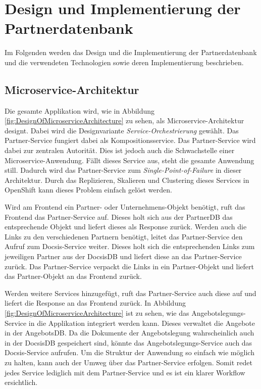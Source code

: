 \chapter{Design und Implementierung der Partnerdatenbank}
Im Folgenden werden das Design und die Implementierung der Partnerdatenbank und die verwendeten Technologien sowie deren Implementierung beschrieben.

\section{Microservice-Architektur}
Die gesamte Applikation wird, wie in Abbildung \ref{fig:DesignOfMicroserviceArchitecture} zu sehen, als Microservice-Architektur designt. Dabei wird die Designvariante \textit{Service-Orchestrierung} gewählt. Das Partner-Service fungiert dabei als Kompositionsservice. Das Partner-Service wird dabei zur zentralen Autorität. Dies ist jedoch auch die Schwachstelle einer Microservice-Anwendung. Fällt dieses Service aus, steht die gesamte Anwendung still. Dadurch wird das Partner-Service zum \textit{Single-Point-of-Failure} in dieser Architektur. Durch das Replizieren, Skalieren und Clustering dieses Services in OpenShift kann dieses Problem einfach gelöst werden.

Wird am Frontend ein Partner- oder Unternehmens-Objekt benötigt, ruft das Frontend das Partner-Service auf. Dieses holt sich aus der PartnerDB das entsprechende Objekt und liefert dieses als Response zurück.
Werden auch die Links zu den verschiedenen Partnern benötigt, leitet das Partner-Service den Aufruf zum Docsis-Service weiter. Dieses holt sich die entsprechenden Links zum jeweiligen Partner aus der DocsisDB und liefert diese an das Partner-Service zurück. Das Partner-Service verpackt die Links in ein Partner-Objekt und liefert das Partner-Objekt an das Frontend zurück.

Werden weitere Services hinzugefügt, ruft das Partner-Service auch diese auf und liefert die Response an das Frontend zurück. In Abbildung \ref{fig:DesignOfMicroserviceArchitecture} ist zu sehen, wie das Angebotslegungs-Service in die Applikation integriert werden kann. Dieses verwaltet die Angebote in der AngebotsDB. Da die Dokumente der Angebotslegung wahrscheinlich auch in der DocsisDB gespeichert sind, könnte das Angebotslegungs-Service auch das Docsis-Service aufrufen. Um die Struktur der Anwendung so einfach wie möglich zu halten, kann auch der Umweg über das Partner-Service erfolgen. Somit redet jedes Service lediglich mit dem Partner-Service und es ist ein klarer Workflow ersichtlich.


